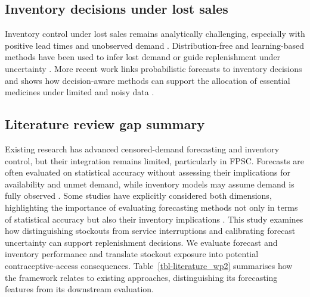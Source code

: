 \documentclass[
  11pt,
  authoryear,
  doubleblind,
  3p]{elsarticle}
\begin{document}
\subsection{Inventory decisions under lost
sales}\label{inventory-decisions-under-lost-sales}

Inventory control under lost sales remains analytically challenging,
especially with positive lead times and unobserved demand
\citep{bijvank2011, heese2010}. Distribution-free and learning-based
methods have been used to infer lost demand or guide replenishment under
uncertainty \citep{sachs2014, godfrey2001, zheng2026}. More recent work
links probabilistic forecasts to inventory decisions and shows how
decision-aware methods can support the allocation of essential medicines
under limited and noisy data \citep{chung2026}.

\subsection{Literature review gap
summary}\label{literature-review-gap-summary}

Existing research has advanced censored-demand forecasting and inventory
control, but their integration remains limited, particularly in FPSC.
Forecasts are often evaluated on statistical accuracy without assessing
their implications for availability and unmet demand, while inventory
models may assume demand is fully observed \citep{babai2025}. Some
studies have explicitly considered both dimensions, highlighting the
importance of evaluating forecasting methods not only in terms of
statistical accuracy but also their inventory implications
\citep[e.g.,][]{babai2020}. This study examines how distinguishing
stockouts from service interruptions and calibrating forecast
uncertainty can support replenishment decisions. We evaluate forecast
and inventory performance and translate stockout exposure into potential
contraceptive-access consequences. Table~\ref{tbl-literature_wp2}
summarises how the framework relates to existing approaches,
distinguishing its forecasting features from its downstream evaluation.

\begingroup\fontsize{6}{8}\selectfont
\end{document}
